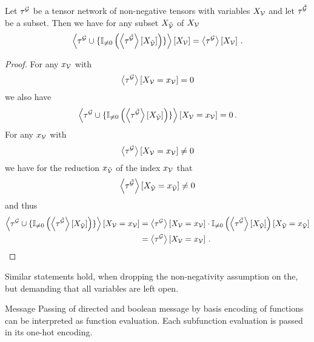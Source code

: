 \begin{theorem}\label{the:invarianceAddingSubcontractions}
	Let $\tau^{\mathcal{G}}$ be a tensor network of non-negative tensors with variables $X_{\mathcal{V}}$ and let $\tau^{\tilde{\mathcal{G}}}$ be a subset.
	Then we have for any subset $X_{\tilde{\mathcal{V}}}$ of $X_{\mathcal{V}}$
		\[ \left\langle \tau^{\mathcal{G}} \cup\{
			\mathbb{I}_{\neq0}\left(
			\left\langle \tau^{\tilde{\mathcal{G}}}\right\rangle \left[ X_{\tilde{\mathcal{V}}} \right]
			\right)
		\}\right\rangle \left[ X_{\mathcal{V}} \right]
		= \left\langle \tau^{\mathcal{G}}\right\rangle \left[ X_{\mathcal{V}} \right]
		\, . \]
\end{theorem}
\begin{proof}
	For any $x_{\mathcal{V}}$ with
		\[ \left\langle \tau^{\mathcal{G}}\right\rangle \left[ X_{\mathcal{V}}=x_{\mathcal{V}} \right] = 0 \]
	we also have
		\[ \left\langle \tau^{\mathcal{G}} \cup\{
			\mathbb{I}_{\neq0}\left(
			\left\langle \tau^{\tilde{\mathcal{G}}}\right\rangle \left[ X_{\tilde{\mathcal{V}}} \right]
			\right)
		\}\right\rangle \left[ X_{\mathcal{V}}=x_{\mathcal{V}} \right] = 0 \, . \]
	For any $x_{\mathcal{V}}$ with
		\[ \left\langle \tau^{\mathcal{G}}\right\rangle \left[ X_{\mathcal{V}}=x_{\mathcal{V}} \right] \neq 0 \]
	we have for the reduction $x_{\tilde{\mathcal{V}}}$ of the index $x_{\mathcal{V}}$ that
		\[  \left\langle \tau^{\tilde{\mathcal{G}}}\right\rangle \left[ X_{\tilde{\mathcal{V}}}=x_{\tilde{\mathcal{V}}} \right] \neq 0 \]
	and thus
	\begin{align*}
		\left\langle \tau^{\mathcal{G}} \cup\{
			\mathbb{I}_{\neq0}\left(
			\left\langle \tau^{\tilde{\mathcal{G}}}\right\rangle \left[ X_{\tilde{\mathcal{V}}} \right]
			\right)
		\}\right\rangle \left[ X_{\mathcal{V}}=x_{\mathcal{V}} \right]
		&= \left\langle \tau^{\mathcal{G}}\right\rangle \left[ X_{\mathcal{V}}=x_{\mathcal{V}} \right] \cdot \mathbb{I}_{\neq0}\left(
			\left\langle \tau^{\tilde{\mathcal{G}}}\right\rangle \left[ X_{\tilde{\mathcal{V}}} \right]
			\right)[X_{\tilde{\mathcal{V}}}=x_{\tilde{\mathcal{V}}}] \\
		&= \left\langle \tau^{\mathcal{G}}\right\rangle \left[ X_{\mathcal{V}}=x_{\mathcal{V}} \right] \, .
	\end{align*}
\end{proof}


\begin{remark}
	Similar statements hold, when dropping the non-negativity assumption on the, but demanding that all variables are left open.
\end{remark}


Message Passing of directed and boolean message by basis encoding of functions can be interpreted as function evaluation.
Each subfunction evaluation is passed in its one-hot encoding.

